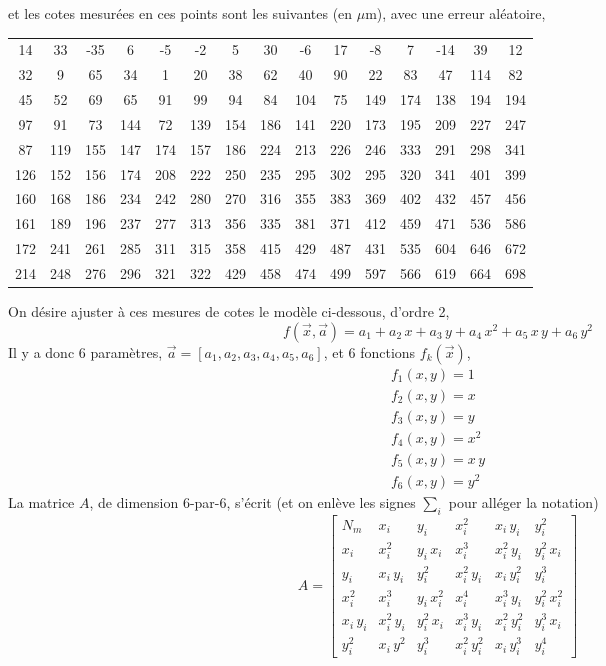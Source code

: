 et les cotes mesurées en ces points sont les suivantes (en $\mu$m), avec une erreur aléatoire,
\begin{center}
\begin{tabular}{ccccccccccccccc}
14 & 33 & -35 & 6 & -5 & -2 & 5 & 30 & -6 & 17 & -8 & 7 & -14 & 39 & 12\\
32 & 9 & 65 & 34 & 1 & 20 & 38 & 62 & 40 & 90 & 22 & 83 & 47 & 114 & 82\\
45 & 52 & 69 & 65 & 91 & 99 & 94 & 84 & 104 & 75 & 149 & 174 & 138 & 194 & 194\\
97 & 91 & 73 & 144 & 72 & 139 & 154 & 186 & 141 & 220 & 173 & 195 & 209 & 227 & 247\\
87 & 119 & 155 & 147 & 174 & 157 & 186 & 224 & 213 & 226 & 246 & 333 & 291 & 298 & 341\\
126 & 152 & 156 & 174 & 208 & 222 & 250 & 235 & 295 & 302 & 295 & 320 & 341 & 401 & 399\\
160 & 168 & 186 & 234 & 242 & 280 & 270 & 316 & 355 & 383 & 369 & 402 & 432 & 457 & 456\\
161 & 189 & 196 & 237 & 277 & 313 & 356 & 335 & 381 & 371 & 412 & 459 & 471 & 536 & 586\\
172 & 241 & 261 & 285 & 311 & 315 & 358 & 415 & 429 & 487 & 431 & 535 & 604 & 646 & 672\\
214 & 248 & 276 & 296 & 321 & 322 & 429 & 458 & 474 & 499 & 597 & 566 & 619 & 664 & 698
\end{tabular}
\end{center}
On désire ajuster à ces mesures de cotes le modèle ci-dessous, d'ordre 2,
\begin{equation}
f(\vec{x},\vec{a})=a_1+a_2\,x+a_3\,y+a_4\,x^2+a_5\,x\,y+a_6\,y^2
\end{equation}
Il y a donc 6 paramètres, $\vec{a}=[a_1,a_2,a_3,a_4,a_5,a_6]$, et 6 fonctions $f_k(\vec{x})$,
\begin{gather}
f_1(x,y)=1\\
f_2(x,y)=x\\
f_3(x,y)=y\\
f_4(x,y)=x^2\\
f_5(x,y)=x\,y\\
f_6(x,y)=y^2
\end{gather}
La matrice $A$, de dimension 6-par-6, s'écrit (et on enlève les signes $\sum_i$ pour alléger la notation)
\begin{equation}
A=
\begin{bmatrix}
N_m    & x_i        & y_i        & x_i^2        & x_i\,y_i     & y_i^2 \\
x_i    & x_i^2      & y_i\,x_i   & x_i^3        & x_i^2\,y_i   & y_i^2\,x_i \\
y_i    & x_i\,y_i   & y_i^2      & x_i^2\,y_i   & x_i\,y_i^2   & y_i^3 \\
x_i^2  & x_i^3      & y_i\,x_i^2 & x_i^4        & x_i^3\,y_i   & y_i^2\,x_i^2 \\
x_i\,y_i & x_i^2\,y_i & y_i^2\,x_i & x_i^3\,y_i   & x_i^2\,y_i^2 & y_i^3\,x_i \\
y_i^2  & x_i\,y^2   & y_i^3      & x_i^2\,y_i^2 & x_i\,y_i^3   & y_i^4
\end{bmatrix}
\end{equation}
